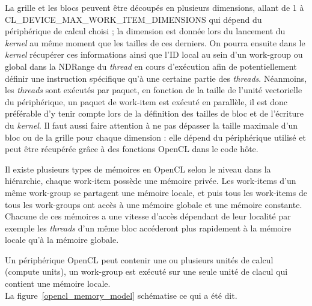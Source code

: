 La grille et les blocs peuvent être découpés en plusieurs dimensions, allant de
1 à \og{} CL\_DEVICE\_MAX\_WORK\_ITEM\_DIMENSIONS \fg{} qui dépend du
périphérique de calcul choisi ; la dimension est donnée lors du lancement du
\emph{kernel} au même moment que les tailles de ces derniers. On pourra ensuite
dans le \emph{kernel} récupérer ces informations ainsi que l'ID local au sein
d'un work-group ou global dans la NDRange du \emph{thread} en cours d'exécution
afin de potentiellement définir une instruction spécifique qu'à une certaine
partie des \emph{threads}. Néanmoins, les \emph{threads} sont exécutés par
paquet, en fonction de la taille de l'unité vectorielle du périphérique, un
paquet de work-item est exécuté en parallèle, il est donc préférable d'y tenir
compte lors de la définition des tailles de bloc et de l'écriture du
\emph{kernel}. Il faut aussi faire attention à ne pas dépasser la taille
maximale d'un bloc ou de la grille pour chaque dimension : elle dépend du
périphérique utilisé et peut être récupérée grâce à des fonctions OpenCL dans le
code hôte.

Il existe plusieurs types de mémoires en OpenCL selon le niveau dans la
hiérarchie, chaque work-item possède une mémoire privée. Les work-items d'un
même work-group se partagent une mémoire locale, et puis tous les work-items de
tous les work-groups ont accès à une mémoire globale et une mémoire constante.
Chacune de ces mémoires a une vitesse d'accès dépendant de leur localité par
exemple les \emph{threads} d'un même bloc accéderont plus rapidement à la
mémoire locale qu'à la mémoire globale.

Un périphérique OpenCL peut contenir une ou plusieurs unités de calcul (compute
units), un work-group est exécuté sur une seule unité de clacul qui contient une
mémoire locale.\\
La figure~\ref{opencl_memory_model} schématise ce qui a été dit.


